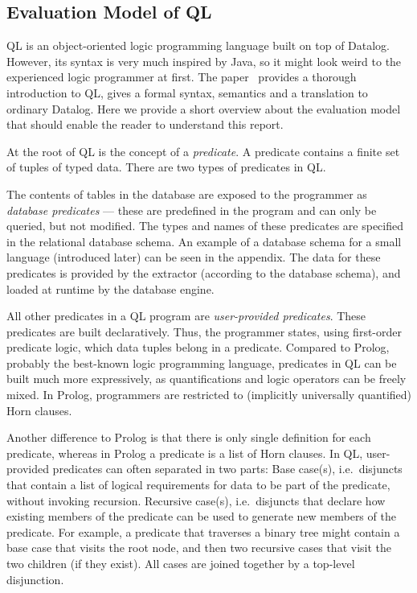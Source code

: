 \subsection{Evaluation Model of QL}
QL is an object-oriented logic programming language built on top of Datalog.
However, its syntax is very much inspired by Java, so it might look weird to the 
experienced logic programmer at first.
The paper~\cite{qlpaper} provides a thorough introduction to QL, gives a 
formal syntax, semantics and a translation to ordinary Datalog.
Here we provide a short overview about the evaluation model that should
enable the reader to understand this report.

At the root of QL is the concept of a \emph{predicate}.
A predicate contains a finite set of tuples of typed data.
There are two types of predicates in QL.

The contents of tables in the database are exposed to the programmer as \emph{database 
predicates} --- these are predefined in the program and can only be queried, but not modified.
The types and names of these predicates are specified in the relational database schema.
An example of a database schema for a small language (introduced later) can be 
seen in the appendix.
The data for these predicates is provided by the extractor (according to the database schema),
and loaded at runtime by the database engine.

All other predicates in a QL program are \emph{user-provided predicates}.
These predicates are built declaratively.
Thus, the programmer states, using first-order predicate logic,
which data tuples belong in a predicate.
Compared to Prolog, probably the best-known logic programming language,
predicates in QL can be built much more expressively,
as quantifications and logic operators can be freely mixed.
In Prolog, programmers are restricted to (implicitly universally quantified) Horn clauses.

Another difference to Prolog is that there is only single definition for each predicate,
whereas in Prolog a predicate is a list of Horn clauses.
In QL, user-provided predicates can often separated in two parts:
Base case(s), i.e.\ disjuncts that contain a list of logical requirements for data 
to be part of the predicate, without invoking recursion.
Recursive case(s), i.e.\ disjuncts that declare how existing members of the predicate 
can be used to generate new members of the predicate.
For example, a predicate that traverses a binary tree might contain a base case that visits 
the root node, and then two recursive cases that visit the two children (if they exist).
All cases are joined together by a top-level disjunction.

